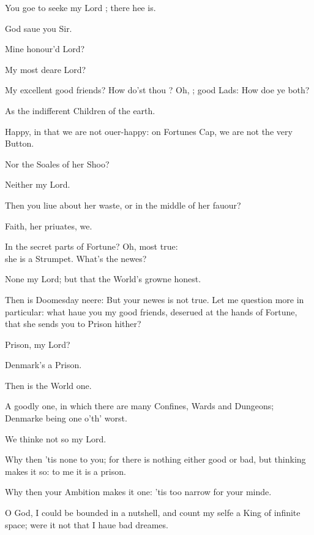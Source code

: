 \documentclass[a5paper,DIV=calc,11pt]{scrbook}
\begin{document}
\begin{drama*}
    \polspeaks You goe to seeke my Lord \ham; there hee is.
    
    
    \rosinspeaks God saue you Sir.
    
    \guilspeaks Mine honour'd Lord?
    
    \rosinspeaks My most deare Lord?
    
    \hamspeaks My excellent good friends? How do'st thou \guil? Oh, \rosin; good Lads: How doe ye both?
    
    \rosinspeaks As the indifferent Children of the earth.
    
    \guilspeaks Happy, in that we are not ouer-happy: on Fortunes Cap, we are not the very Button.
    
    \hamspeaks Nor the Soales of her Shoo?
    
    \rosinspeaks Neither my Lord.
    
    \hamspeaks Then you liue about her waste, or in the middle of her fauour?
    
    \guilspeaks Faith, her priuates, we.
    
    \hamspeaks In the secret parts of Fortune? Oh, most true:\\
    she is a Strumpet. What's the newes?
    
    \rosinspeaks None my Lord; but that the World's growne honest.
    
    \hamspeaks Then is Doomesday neere: But your newes is not true. Let me question more in particular: what haue you my good friends, deserued at the hands of Fortune, that she sends you to Prison hither?
    
    \guilspeaks Prison, my Lord?
    
    \hamspeaks Denmark's a Prison.
    
    \rosinspeaks Then is the World one.
    
    \hamspeaks A goodly one, in which there are many Confines, Wards and Dungeons; Denmarke being one o'th' worst.
    
    \rosinspeaks We thinke not so my Lord.
    
    \hamspeaks Why then 'tis none to you; for there is nothing either good or bad, but thinking makes it so: to me it is a prison.
    
    \rosinspeaks Why then your Ambition makes it one: 'tis too narrow for your minde.
    
    \hamspeaks O God, I could be bounded in a nutshell, and count my selfe a King of infinite space; were it not that I haue bad dreames.
    

\end{drama*}
\end{document}
